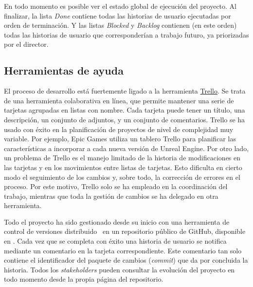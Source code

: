 En todo momento es posible ver el estado global de ejecución del proyecto.  Al finalizar, la lista \emph{Done} contiene todas las historias de usuario ejecutadas por orden de terminación.  Y las listas \emph{Blocked} y \emph{Backlog} contienen (en este orden) todas las historias de usuario que corresponderían a trabajo futuro, ya priorizadas por el director.

\subsection{Herramientas de ayuda}

El proceso de desarrollo está fuertemente ligado a la herramienta \href{https://trello.com/}{Trello}.  Se trata de una herramienta colaborativa en línea, que permite mantener una serie de tarjetas agrupadas en listas con nombre.  Cada tarjeta puede tener un título, una descripción, un conjunto de adjuntos, y un conjunto de comentarios.  Trello se ha usado con éxito en la planificación de proyectos de nivel de complejidad muy variable.  Por ejemplo, Epic Games utiliza un tablero Trello para planificar las características a incorporar a cada nueva versión de Unreal Engine.  Por otro lado, un problema de Trello es el manejo limitado de la historia de modificaciones en las tarjetas y en los movimientos entre listas de tarjetas.  Esto dificulta en cierto modo el seguimiento de los cambios y, sobre todo, la corrección de errores en el proceso.  Por este motivo, Trello solo se ha empleado en la coordinación del trabajo, mientras que toda la gestión de cambios se ha delegado en otra herramienta.

Todo el proyecto ha sido gestionado desde su inicio con una herramienta de control de versiones distribuido~\cite{scottchaconbenstraub2018} en un repositorio público de GitHub, disponible en \thegitrepo.  Cada vez que se completa con éxito una historia de usuario se notifica mediante un comentario en la tarjeta correspondiente.  Este comentario tan solo contiene el identificador del paquete de cambios (\emph{commit}) que da por concluida la historia.  Todos los \emph{stakeholders} pueden consultar la evolución del proyecto en todo momento desde la propia página del repositorio.

